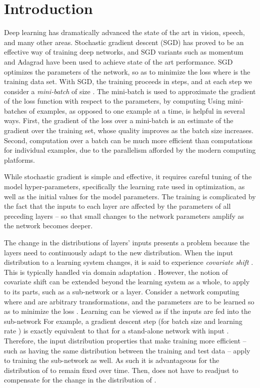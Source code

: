 \documentclass[twocolumn]{article}
\begin{document}
\section{Introduction}


Deep learning has dramatically advanced the state of the art in vision, speech,
and many other areas. Stochastic gradient descent (SGD) has proved to be an effective way of training
deep networks, and SGD variants such as momentum \cite{momentum} and Adagrad \cite{adagrad} have been used to
achieve state of the art performance. SGD optimizes the parameters  of
the network, so as to minimize the loss  where
 is the training data set.  With SGD, the training
proceeds in steps, and at each step we consider a {\em mini-batch}
 of size . The mini-batch is used
to approximate the gradient of the loss function with respect to the parameters,
by computing  Using
mini-batches of examples, as opposed to one example at a time, is helpful in
several ways. First, the gradient of the loss over a mini-batch is an estimate
of the gradient over the training set, whose quality  improves
as the batch size increases. Second, computation over a batch can be much more
efficient than  computations for individual examples, due to the parallelism
afforded by the modern computing platforms.


While stochastic gradient is simple and effective, it requires careful tuning of
the model hyper-parameters, specifically the learning rate used in optimization,
as well as the initial values for the model parameters. The training is
complicated by the fact that the inputs to each layer are affected by the
parameters of all preceding layers -- so that
small changes to the network parameters amplify as the network becomes
deeper.

The change in the distributions of layers' inputs presents a problem
because the layers need to continuously adapt to the new
distribution. When the input distribution to a learning system
changes, it is said to experience {\em covariate shift}
\cite{covariate-shift}. This is typically handled via domain
adaptation \cite{domain-adaptation-survey}. However, the notion of
covariate shift can be extended beyond the learning system as a whole,
to apply to its parts, such as a sub-network or a layer. Consider a
network computing  where
 and  are arbitrary transformations, and the parameters
 are to be learned so as to minimize the loss
.  Learning  can be viewed as if the inputs
 are fed into the sub-network
 For example, a gradient descent step
 (for batch size  and learning
rate ) is exactly equivalent to that for a stand-alone network
 with input .  Therefore, the input distribution properties
that make training more efficient -- such as having the same
distribution between the training and test data -- apply to training
the sub-network as well.  As such it is advantageous for the
distribution of  to remain fixed over time. Then,  does
not have to readjust to compensate for the change in the distribution
of .
\end{document}
